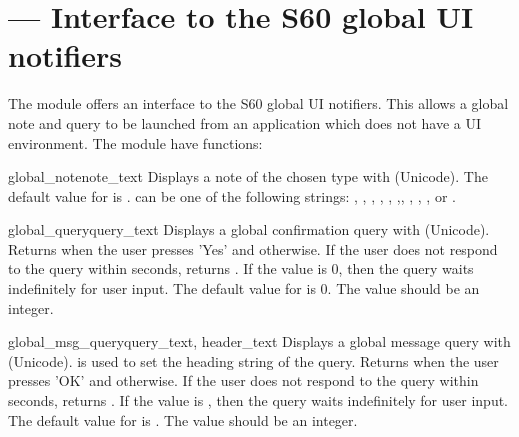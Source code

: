 %
%
%

\section{ --- 
    Interface to the S60 global UI notifiers }
\label{sec:globalui}


The  module offers an interface to the S60 global UI notifiers. 
This allows a global note and query to be launched from an application which does not 
have a UI environment. 
The  module have functions:

\begin{funcdesc}{global_note}{note_text}
Displays a note of the chosen type with  
(Unicode). The default value for  is .  can be 
one of the following strings: , , , ,
, ,, , , 
, or . 
\end{funcdesc}

\begin{funcdesc}{global_query}{query_text}
Displays a global confirmation query with  (Unicode). Returns 
 when the user presses 'Yes' and  otherwise. If the user does 
not respond to the query within  seconds, returns . 
If the  value is 0, then the query waits indefinitely for user input. 
The default value for  is 0. The  value should be an integer.
\end{funcdesc}

\begin{funcdesc}{global_msg_query}{query_text, header_text}
Displays a global message query with (Unicode).  is used 
to set the heading string of the query. Returns  when the user 
presses 'OK' and  otherwise. If the user does not respond to the query within 
 seconds, returns . If the  value is , then the query 
waits indefinitely for user input. The default value for  is . 
The  value should be an integer.
\end{funcdesc}

